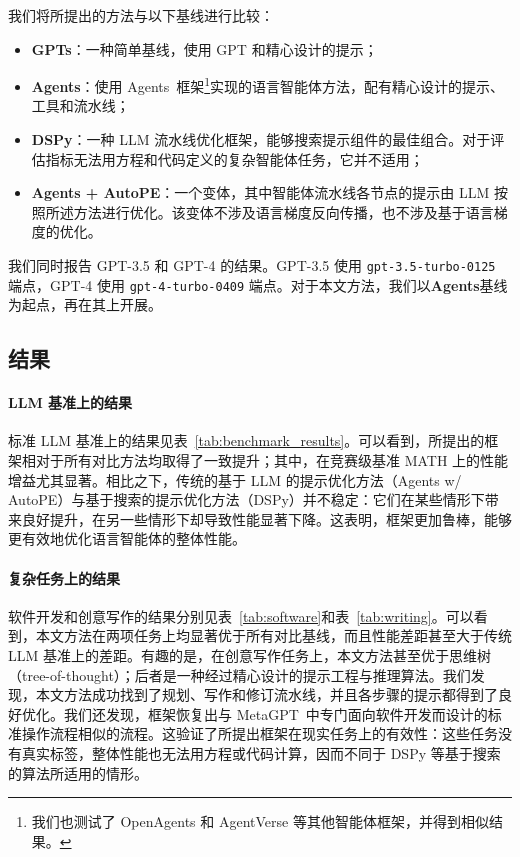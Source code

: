 我们将所提出的方法与以下基线进行比较：
\begin{itemize}
    \item \textbf{GPTs}：一种简单基线，使用 GPT 和精心设计的提示；
    \item \textbf{Agents}：使用 Agents~\citep{zhou2023agents}框架\footnote{我们也测试了 OpenAgents 和 AgentVerse 等其他智能体框架，并得到相似结果。}实现的语言智能体方法，配有精心设计的提示、工具和流水线；
    \item \textbf{DSPy}：一种 LLM 流水线优化框架，能够搜索提示组件的最佳组合。对于评估指标无法用方程和代码定义的复杂智能体任务，它并不适用；
    \item \textbf{Agents + AutoPE}：一个变体，其中智能体流水线各节点的提示由 LLM 按照\citet{yang2024large}所述方法进行优化。该变体不涉及语言梯度反向传播，也不涉及基于语言梯度的优化。
\end{itemize}

我们同时报告 GPT-3.5 和 GPT-4 的结果。GPT-3.5 使用 \texttt{gpt-3.5-turbo-0125} 端点，GPT-4 使用 \texttt{gpt-4-turbo-0409} 端点。对于本文方法，我们以\textbf{Agents}基线为起点，再在其上开展\baby{}。

\subsection{结果}



\paragraph{LLM 基准上的结果}
标准 LLM 基准上的结果见表~\ref{tab:benchmark_results}。可以看到，所提出的\baby{}框架相对于所有对比方法均取得了一致提升；其中，在竞赛级基准 MATH 上的性能增益尤其显著。相比之下，传统的基于 LLM 的提示优化方法（Agents w/ AutoPE）与基于搜索的提示优化方法（DSPy）并不稳定：它们在某些情形下带来良好提升，在另一些情形下却导致性能显著下降。这表明，\baby{}框架更加鲁棒，能够更有效地优化语言智能体的整体性能。

\paragraph{复杂任务上的结果}
软件开发和创意写作的结果分别见表~\ref{tab:software}和表~\ref{tab:writing}。可以看到，本文方法在两项任务上均显著优于所有对比基线，而且性能差距甚至大于传统 LLM 基准上的差距。有趣的是，在创意写作任务上，本文方法甚至优于思维树（tree-of-thought）；后者是一种经过精心设计的提示工程与推理算法。我们发现，本文方法成功找到了规划、写作和修订流水线，并且各步骤的提示都得到了良好优化。我们还发现，\baby{}框架恢复出与 MetaGPT~\citep{hong2023metagpt}中专门面向软件开发而设计的标准操作流程相似的流程。这验证了所提出\baby{}框架在现实任务上的有效性：这些任务没有真实标签，整体性能也无法用方程或代码计算，因而不同于 DSPy 等基于搜索的算法所适用的情形。

